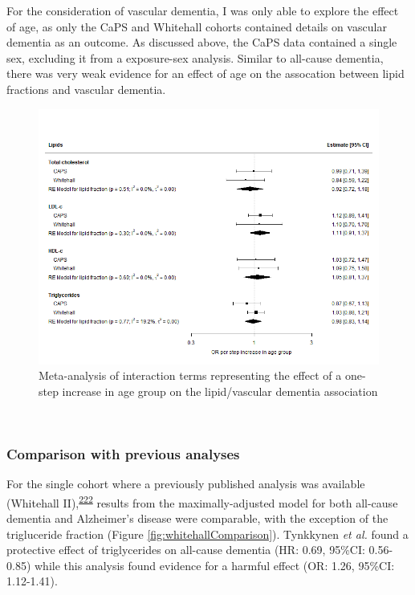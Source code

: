 \documentclass[a4paper, twoside]{templates/ociamthesis}
\begin{document}
For the consideration of vascular dementia, I was only able to explore the effect of age, as only the CaPS and Whitehall cohorts contained details on vascular dementia as an outcome. As discussed above, the CaPS data contained a single sex, excluding it from a exposure-sex analysis. Similar to all-cause dementia, there was very weak evidence for an effect of age on the assocation between lipid fractions and vascular dementia.





\begin{figure}[H]
\includegraphics[width=1\linewidth]{figures/ipd/interaction_age_vasdem} \caption[shortcap]{Meta-analysis of interaction terms representing the effect of a one-step increase in age group on the lipid/vascular dementia association}\label{fig:interactionVascularAge}
\end{figure}

~

\hypertarget{comparison-with-previous-analyses}{%
\subsubsection{Comparison with previous analyses}\label{comparison-with-previous-analyses}}

For the single cohort where a previously published analysis was available (Whitehall II),\textsuperscript{\protect\hyperlink{ref-tynkkynen2018}{222}} results from the maximally-adjusted model for both all-cause dementia and Alzheimer's disease were comparable, with the exception of the trigluceride fraction (Figure \ref{fig:whitehallComparison}). Tynkkynen \emph{et al.} found a protective effect of triglycerides on all-cause dementia (HR: 0.69, 95\%CI: 0.56-0.85) while this analysis found evidence for a harmful effect (OR: 1.26, 95\%CI: 1.12-1.41).
\end{document}
